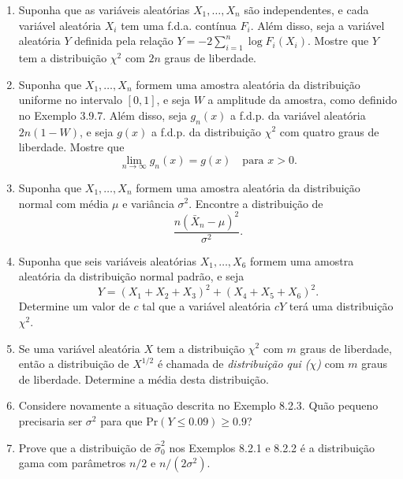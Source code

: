 \begin{enumerate}
    \item Suponha que as variáveis aleatórias $X_1, \dots, X_n$ são independentes, e cada variável aleatória $X_i$ tem uma f.d.a. contínua $F_i$. Além disso, seja a variável aleatória $Y$ definida pela relação $Y = -2\sum_{i=1}^{n} \log F_i(X_i)$. Mostre que $Y$ tem a distribuição $\chi^2$ com $2n$ graus de liberdade.

    \item Suponha que $X_1, \dots, X_n$ formem uma amostra aleatória da distribuição uniforme no intervalo $[0, 1]$, e seja $W$ a amplitude da amostra, como definido no Exemplo 3.9.7. Além disso, seja $g_n(x)$ a f.d.p. da variável aleatória $2n(1-W)$, e seja $g(x)$ a f.d.p. da distribuição $\chi^2$ com quatro graus de liberdade. Mostre que
    $$ \lim_{n \to \infty} g_n(x) = g(x) \quad \text{para } x > 0. $$

    \item Suponha que $X_1, \dots, X_n$ formem uma amostra aleatória da distribuição normal com média $\mu$ e variância $\sigma^2$. Encontre a distribuição de
    $$ \frac{n(\bar{X}_n - \mu)^2}{\sigma^2}. $$

    \item Suponha que seis variáveis aleatórias $X_1, \dots, X_6$ formem uma amostra aleatória da distribuição normal padrão, e seja
    $$ Y = (X_1+X_2+X_3)^2 + (X_4+X_5+X_6)^2. $$
    Determine um valor de $c$ tal que a variável aleatória $cY$ terá uma distribuição $\chi^2$.

    \item Se uma variável aleatória $X$ tem a distribuição $\chi^2$ com $m$ graus de liberdade, então a distribuição de $X^{1/2}$ é chamada de \textit{distribuição qui ($\chi$)} com $m$ graus de liberdade. Determine a média desta distribuição.
    
    \item Considere novamente a situação descrita no Exemplo 8.2.3. Quão pequeno precisaria ser $\sigma^2$ para que $\text{Pr}(Y \le 0.09) \ge 0.9$?

    \item Prove que a distribuição de $\hat{\sigma}_0^2$ nos Exemplos 8.2.1 e 8.2.2 é a distribuição gama com parâmetros $n/2$ e $n/(2\sigma^2)$.

\end{enumerate}